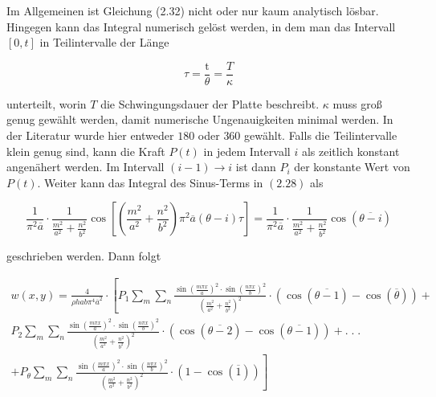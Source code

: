 Im Allgemeinen ist Gleichung (2.32) nicht oder nur kaum analytisch lösbar. Hingegen kann das Integral numerisch gelöst werden, in dem man das Intervall $\left[ 0,t \right]$ in Teilintervalle der Länge

 \begin{equation}
 	\tau = \dfrac{\mbox{t}}{\theta}=\dfrac{T}{\kappa}
 \end{equation}
 
 unterteilt, worin $T$ die Schwingungsdauer der Platte beschreibt. $\kappa$ muss groß genug gewählt werden, damit numerische Ungenauigkeiten minimal werden. In der Literatur wurde hier entweder $180$ oder $360$ gewählt. Falls die Teilintervalle klein genug sind, kann die Kraft $P(t)$ in jedem Intervall $i$ als zeitlich konstant angenähert werden. Im Intervall $(i-1) \rightarrow i$ ist dann $P_{i}$ der konstante Wert von $P(t)$. Weiter kann das Integral des Sinus-Terms in $(2.28)$ als
 
 \begin{equation}
 	\frac{1}{\pi^2\overline{a}} \cdot \frac{1}{\frac{m^2}{a^2}+\frac{n^2}{b^2}} \cos \left[ \left( \frac{m^2}{a^2}+\frac{n^2}{b^2} \right) \pi^2\overline{a}(\theta - i)\tau\right]= \frac{1}{\pi^2\overline{a}} \cdot \frac{1}{\frac{m^2}{a^2}+\frac{n^2}{b^2}} \cos(\overline{\theta-i})
 \end{equation}  

geschrieben werden. Dann folgt

\begin{equation}
\begin{multlined}
	w(x,y) = \frac{4}{\rho h a b \pi^4 \overline{a}^2} \cdot \left[ P_{1} \sum_m \sum_n \frac{\sin \left( \frac{m \pi x}{a} \right)^2 \cdot \sin \left( \frac{n \pi x}{b} \right)^2}{ \left( \frac{m^2}{a^2} + \frac{n^2}{b^2} \right)^2} \cdot \left( \cos(\overline{\theta-1}) - \cos(\overline{\theta}) \right) + \right. \\ P_{2} \sum_m \sum_n \frac{\sin \left( \frac{m \pi x}{a} \right)^2 \cdot \sin \left( \frac{n \pi x}{b} \right)^2}{ \left( \frac{m^2}{a^2} + \frac{n^2}{b^2} \right)^2} \cdot \left( \cos(\overline{\theta-2}) - \cos(\overline{\theta-1}) \right) + . \; . \; .\ \\ \left. + P_{\theta} \sum_m \sum_n \frac{\sin \left( \frac{m \pi x}{a} \right)^2 \cdot \sin \left( \frac{n \pi x}{b} \right)^2}{ \left( \frac{m^2}{a^2} + \frac{n^2}{b^2} \right)^2} \cdot \left( 1 - \cos(\overline{1}) \right) \right]
\end{multlined}
\end{equation}

